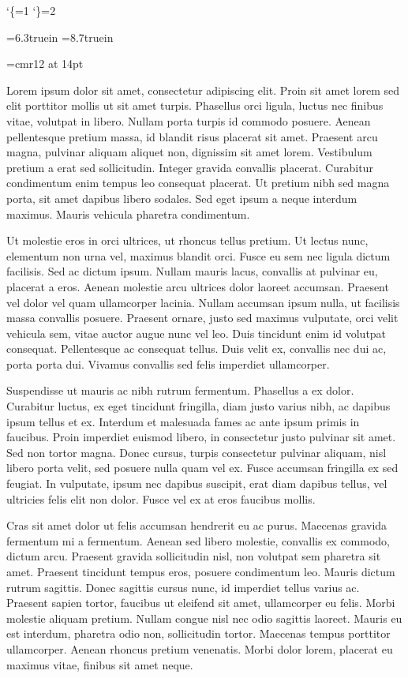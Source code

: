 
\catcode`\{=1
\catcode`\}=2

\baselineskip=12pt
\hsize=6.3truein
\vsize=8.7truein

\font\bigrm=cmr12 at 14pt

Lorem ipsum dolor sit amet, consectetur adipiscing elit. Proin sit amet lorem sed elit porttitor mollis ut sit amet turpis. Phasellus orci ligula, luctus nec finibus vitae, volutpat in libero. Nullam porta turpis id commodo posuere. Aenean \bigrm pellentesque pretium massa, id blandit risus placerat sit amet. Praesent arcu magna, pulvinar aliquam aliquet non, dignissim sit amet lorem. Vestibulum pretium a erat sed sollicitudin. Integer gravida convallis placerat. Curabitur condimentum enim tempus leo consequat placerat. Ut pretium nibh sed magna porta, sit amet dapibus libero sodales. Sed eget ipsum a neque interdum maximus. Mauris vehicula pharetra condimentum.

Ut molestie eros in orci ultrices, ut rhoncus tellus pretium. Ut lectus nunc, elementum non urna vel, maximus blandit orci. Fusce eu sem nec ligula dictum facilisis. Sed ac dictum ipsum. Nullam mauris lacus, convallis at pulvinar eu, placerat a eros. Aenean molestie arcu ultrices dolor laoreet accumsan. Praesent vel dolor vel quam ullamcorper lacinia. Nullam accumsan ipsum nulla, ut facilisis massa convallis posuere. Praesent ornare, justo sed maximus vulputate, orci velit vehicula sem, vitae auctor augue nunc vel leo. Duis tincidunt enim id volutpat consequat. Pellentesque ac consequat tellus. Duis velit ex, convallis nec dui ac, porta porta dui. Vivamus convallis sed felis imperdiet ullamcorper.

Suspendisse ut mauris ac nibh rutrum fermentum. Phasellus a ex dolor. Curabitur luctus, ex eget tincidunt fringilla, diam justo varius nibh, ac dapibus ipsum tellus et ex. Interdum et malesuada fames ac ante ipsum primis in faucibus. Proin imperdiet euismod libero, in consectetur justo pulvinar sit amet. Sed non tortor magna. Donec {\tenrm cursus, turpis consectetur pulvinar aliquam, nisl libero porta velit, sed posuere nulla quam vel ex. Fusce accumsan fringilla ex sed feugiat. In vulputate, ipsum nec dapibus suscipit, erat diam dapibus tellus, vel ultricies felis elit non dolor. Fusce vel ex at eros faucibus mollis}.

{\tentt Cras sit amet dolor ut felis accumsan hendrerit eu ac purus. Maecenas gravida fermentum mi a fermentum. Aenean sed libero molestie, convallis ex commodo, dictum arcu. Praesent gravida sollicitudin nisl, non volutpat sem pharetra sit amet. Praesent tincidunt tempus eros, posuere condimentum leo. Mauris dictum rutrum sagittis. Donec sagittis cursus nunc, id imperdiet tellus varius ac. Praesent sapien tortor, faucibus ut eleifend sit amet, ullamcorper eu felis. Morbi molestie aliquam pretium. Nullam congue nisl nec odio sagittis laoreet. Mauris eu est interdum, pharetra odio non, sollicitudin tortor. Maecenas tempus porttitor ullamcorper. Aenean rhoncus pretium venenatis. Morbi dolor lorem, placerat eu maximus vitae, finibus sit amet neque.}

